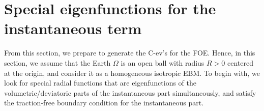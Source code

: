 \documentclass[a4paper,12pt]{article}
\newtheorem{a priori condition}[Th]{A priori condition}
\begin{document}

\section{Special eigenfunctions for the instantaneous
term}
\setcounter{equation}{0}
From this section, we prepare to generate the C-ev's for the FOE. Hence, in this section, we assume that the Earth $\Omega$ is an open ball with radius $R>0$ centered at the origin, and consider it as a homogeneous isotropic EBM. To begin with, we look for special radial functions that are eigenfunctions of the volumetric/deviatoric parts of the instantaneous part simultaneously, and satisfy the traction-free boundary condition for the instantaneous part. 
\end{document}
